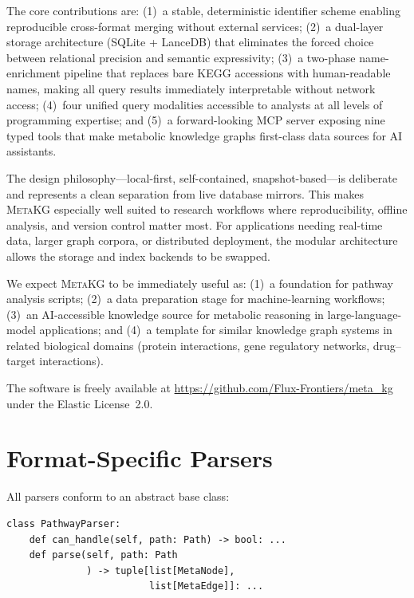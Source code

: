 \documentclass[10pt]{article}
\begin{document}
The core contributions are: (1)~a stable, deterministic identifier scheme
enabling reproducible cross-format merging without external services; (2)~a
dual-layer storage architecture (SQLite + LanceDB) that eliminates the forced
choice between relational precision and semantic expressivity; (3)~a
two-phase name-enrichment pipeline that replaces bare KEGG accessions with
human-readable names, making all query results immediately interpretable
without network access; (4)~four unified query modalities accessible to
analysts at all levels of programming expertise; and (5)~a forward-looking
MCP server exposing nine typed tools that make metabolic knowledge graphs
first-class data sources for AI assistants.

The design philosophy---local-first, self-contained, snapshot-based---is
deliberate and represents a clean separation from live database mirrors. This
makes \textsc{MetaKG} especially well suited to research workflows where
reproducibility, offline analysis, and version control matter most. For
applications needing real-time data, larger graph corpora, or distributed
deployment, the modular architecture allows the storage and index backends to
be swapped.

We expect \textsc{MetaKG} to be immediately useful as: (1)~a foundation for
pathway analysis scripts; (2)~a data preparation stage for machine-learning
workflows; (3)~an AI-accessible knowledge source for metabolic reasoning in
large-language-model applications; and (4)~a template for similar knowledge
graph systems in related biological domains (protein interactions, gene
regulatory networks, drug--target interactions).

The software is freely available at
\url{https://github.com/Flux-Frontiers/meta_kg} under the Elastic License~2.0.

\appendix

\section{Format-Specific Parsers}
\label{sec:parsers-detail}

All parsers conform to an abstract base class:

\begin{lstlisting}[style=python]
class PathwayParser:
    def can_handle(self, path: Path) -> bool: ...
    def parse(self, path: Path
              ) -> tuple[list[MetaNode],
                         list[MetaEdge]]: ...
\end{lstlisting}
\end{document}
